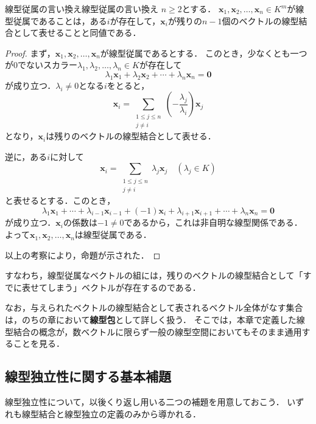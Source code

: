 \begin{prop}{線型従属の言い換え}{線型従属の言い換え}
  $n \ge 2$とする．
  $\bm{x}_1, \bm{x}_2, \dots, \bm{x}_n \in K^m$が線型従属であることは，ある$i$が存在して，$\bm{x}_i$が残りの$n - 1$個のベクトルの線型結合として表せることと同値である．
\end{prop}

\begin{leftbar}
\begin{proof}
  まず，$\bm{x}_1, \bm{x}_2, \dots, \bm{x}_n$が線型従属であるとする．
  このとき，少なくとも一つが$0$でないスカラー$\lambda_1, \lambda_2, \dots, \lambda_n \in K$が存在して
  \[
    \lambda_1 \bm{x}_1 + \lambda_2 \bm{x}_2 + \cdots + \lambda_n \bm{x}_n = \bm{0}
  \]
  が成り立つ．$\lambda_i \ne 0$となる$i$をとると，
  \[
    \bm{x}_i = \sum_{\substack{1 \le j \le n \\ j \ne i}} \left(-\frac{\lambda_j}{\lambda_i}\right) \bm{x}_j
  \]
  となり，$\bm{x}_i$は残りのベクトルの線型結合として表せる．

  逆に，ある$i$に対して
  \[
    \bm{x}_i = \sum_{\substack{1 \le j \le n \\ j \ne i}} \lambda_j \bm{x}_j
    \quad (\lambda_j \in K)
  \]
  と表せるとする．このとき，
  \[
    \lambda_1 \bm{x}_1 + \cdots + \lambda_{i-1} \bm{x}_{i-1} + (-1)\bm{x}_i + \lambda_{i+1} \bm{x}_{i+1} + \cdots + \lambda_n \bm{x}_n = \bm{0}
  \]
  が成り立つ．$\bm{x}_i$の係数は$-1 \ne 0$であるから，これは非自明な線型関係である．
  よって$\bm{x}_1, \bm{x}_2, \dots, \bm{x}_n$は線型従属である．

  以上の考察により，命題が示された．
\end{proof}
\end{leftbar}

すなわち，線型従属なベクトルの組には，残りのベクトルの線型結合として「すでに表せてしまう」ベクトルが存在するのである．

なお，与えられたベクトルの線型結合として表されるベクトル全体がなす集合は，のちの章において\textbf{線型包}として詳しく扱う．
そこでは，本章で定義した線型結合の概念が，数ベクトルに限らず一般の線型空間においてもそのまま通用することを見る．

\subsection{線型独立性に関する基本補題}

線型独立性について，以後くり返し用いる二つの補題を用意しておこう．
いずれも線型結合と線型独立の定義のみから導かれる．

